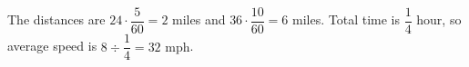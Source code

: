 The distances are $24\cdot\dfrac{5}{60}=2$ miles and $36\cdot\dfrac{10}{60}=6$ miles. Total time is $\dfrac{1}{4}$ hour, so average speed is $8\div\dfrac{1}{4}=\boxed{32\text{ mph}}$.
